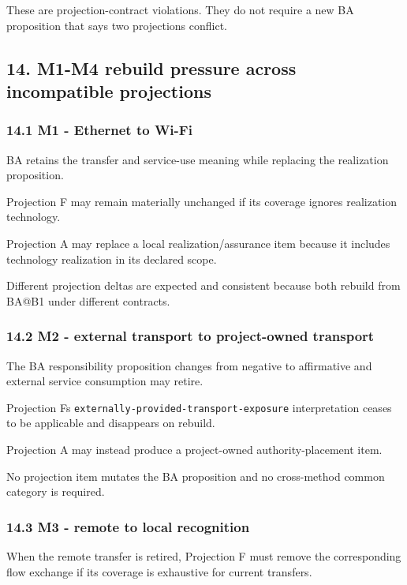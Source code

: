 \documentclass[11pt,a4paper]{article}
\begin{document}
These are projection-contract violations. They do not require a new BA
proposition that says two projections conflict.

\subsection{14. M1-M4 rebuild pressure across incompatible
projections}\label{14-m1-m4-rebuild-pressure-across-incompatible-projections}

\subsubsection{14.1 M1 - Ethernet to
Wi-Fi}\label{141-m1---ethernet-to-wi-fi}

BA retains the transfer and service-use meaning while replacing the
realization proposition.

Projection F may remain materially unchanged if its coverage ignores
realization technology.

Projection A may replace a local realization/assurance item because it
includes technology realization in its declared scope.

Different projection deltas are expected and consistent because both
rebuild from BA@B1 under different contracts.

\subsubsection{14.2 M2 - external transport to project-owned
transport}\label{142-m2---external-transport-to-project-owned-transport}

The BA responsibility proposition changes from negative to affirmative
and external service consumption may retire.

Projection F\textquotesingle s
\texttt{externally-provided-transport-exposure} interpretation ceases to
be applicable and disappears on rebuild.

Projection A may instead produce a project-owned authority-placement
item.

No projection item mutates the BA proposition and no cross-method common
category is required.

\subsubsection{14.3 M3 - remote to local
recognition}\label{143-m3---remote-to-local-recognition}

When the remote transfer is retired, Projection F must remove the
corresponding flow exchange if its coverage is exhaustive for current
transfers.
\end{document}
